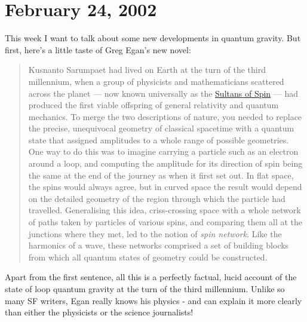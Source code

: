 \documentclass{article}
\def\tightlist{}
\renewcommand{\texttt}[1]{%
  \begingroup
  \ttfamily
  \begingroup\lccode`~=`/\lowercase{\endgroup\def~}{/\discretionary{}{}{}}%
  \begingroup\lccode`~=`[\lowercase{\endgroup\def~}{[\discretionary{}{}{}}%
  \begingroup\lccode`~=`.\lowercase{\endgroup\def~}{.\discretionary{}{}{}}%
  \catcode`/=\active\catcode`[=\active\catcode`.=\active
  \scantokens{#1\noexpand}%
  \endgroup
}
\begin{document}
\hypertarget{week177}{%
\section{February 24, 2002}\label{week177}}

This week I want to talk about some new developments in quantum gravity.
But first, here's a little taste of Greg Egan's new novel:


\begin{quote}
Kusnanto Sarumpaet had lived on Earth at the turn of the third
millennium, when a group of physicists and mathematicians scattered
across the planet --- now known universally as the
\href{http://jdc.math.uwo.ca/spin-foams/sultans.html}{Sultans of Spin}
--- had produced the first viable offspring of general relativity and
quantum mechanics. To merge the two descriptions of nature, you needed
to replace the precise, unequivocal geometry of classical spacetime with
a quantum state that assigned amplitudes to a whole range of possible
geometries. One way to do this was to imagine carrying a particle such
as an electron around a loop, and computing the amplitude for its
direction of spin being the same at the end of the journey as when it
first set out. In flat space, the spins would always agree, but in
curved space the result would depend on the detailed geometry of the
region through which the particle had travelled. Generalising this idea,
criss-crossing space with a whole network of paths taken by particles of
various spins, and comparing them all at the junctions where they met,
led to the notion of \emph{spin network}. Like the harmonics of a wave,
these networks comprised a set of building blocks from which all quantum
states of geometry could be constructed.
\end{quote}

Apart from the first sentence, all this is a perfectly factual, lucid
account of the state of loop quantum gravity at the turn of the third
millennium. Unlike so many SF writers, Egan really knows his physics -
and can explain it more clearly than either the physicists or the
science journalists!
\end{document}
